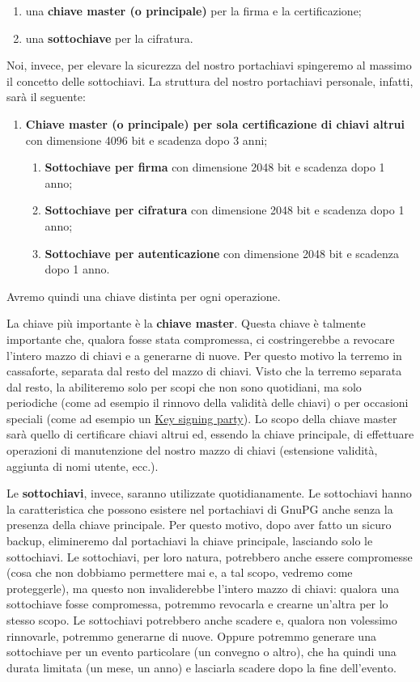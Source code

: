 \documentclass[a4paper,10pt]{article}
\begin{document}
\begin{enumerate}
 \item una \textbf{chiave master (o principale)} per la firma e la certificazione;
 \item una \textbf{sottochiave} per la cifratura.
\end{enumerate}

Noi, invece, per elevare la sicurezza del nostro portachiavi spingeremo al massimo il concetto delle sottochiavi. La struttura del nostro portachiavi personale, infatti, sarà il seguente:

\begin{enumerate}
 \item \textbf{Chiave master (o principale) per sola certificazione di chiavi altrui} con dimensione 4096 bit e scadenza dopo 3 anni;
 \begin{enumerate}
  \item \textbf{Sottochiave per firma} con dimensione 2048 bit e scadenza dopo 1 anno;
   \item \textbf{Sottochiave per cifratura} con dimensione 2048 bit e scadenza dopo 1 anno;
   \item \textbf{Sottochiave per autenticazione} con dimensione 2048 bit e scadenza dopo 1 anno.
 \end{enumerate}
\end{enumerate}

Avremo quindi una chiave distinta per ogni operazione.

La chiave più importante è la \textbf{chiave master}. Questa chiave è talmente importante che, qualora fosse stata compromessa, ci costringerebbe a revocare l'intero mazzo di chiavi e a generarne di nuove. Per questo motivo la terremo in cassaforte, separata dal resto del mazzo di chiavi. Visto che la terremo separata dal resto, la abiliteremo solo per scopi che non sono quotidiani, ma solo periodiche (come ad esempio il rinnovo della validità delle chiavi) o per occasioni speciali (come ad esempio un \href{https://it.wikipedia.org/wiki/Key_signing_party}{Key signing party}). Lo scopo della chiave master sarà quello di certificare chiavi altrui ed, essendo la chiave principale, di effettuare operazioni di manutenzione del nostro mazzo di chiavi (estensione validità, aggiunta di nomi utente, ecc.).

Le \textbf{sottochiavi}, invece, saranno utilizzate quotidianamente. Le sottochiavi hanno la caratteristica che possono esistere nel portachiavi di GnuPG anche senza la presenza della chiave principale. Per questo motivo, dopo aver fatto un sicuro backup, elimineremo dal portachiavi la chiave principale, lasciando solo le sottochiavi. Le sottochiavi, per loro natura, potrebbero anche essere compromesse (cosa che non dobbiamo permettere mai e, a tal scopo, vedremo come proteggerle), ma questo non invaliderebbe l'intero mazzo di chiavi: qualora una sottochiave fosse compromessa, potremmo revocarla e crearne un'altra per lo stesso scopo. Le sottochiavi potrebbero anche scadere e, qualora non volessimo rinnovarle, potremmo generarne di nuove. Oppure potremmo generare una sottochiave per un evento particolare (un convegno o altro), che ha quindi una durata limitata (un mese, un anno) e lasciarla scadere dopo la fine dell'evento.
\end{document}
